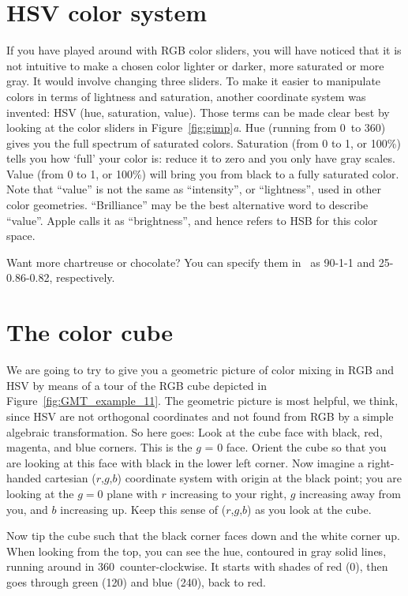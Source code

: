 \section{HSV color system}
If you have played around with RGB color sliders, you will have noticed that it is not intuitive to make a chosen color lighter or darker, more saturated or more gray. It would involve changing three sliders. To make it easier to manipulate colors in terms of lightness and saturation, another coordinate system was invented: HSV (hue, saturation, value). Those terms can be made clear best by looking at the color sliders in Figure~\ref{fig:gimp}\emph{a}. Hue (running from 0\DS\ to 360\DS) gives you the full spectrum of saturated colors. Saturation (from 0 to 1, or 100\%) tells you how `full' your color is: reduce it to zero and you only have gray scales. Value (from 0 to 1, or 100\%) will bring you from black to a fully saturated color. Note that ``value'' is not the same as ``intensity'', or ``lightness'', used in other color geometries. ``Brilliance'' may be the best alternative word to describe ``value''. Apple calls it as ``brightness'', and hence refers to HSB for this color space.

Want more chartreuse or chocolate? You can specify them in \GMT\ as 90-1-1 and 25-0.86-0.82, respectively.

\section{The color cube}
We are going to try to give you a geometric picture of color
mixing in RGB and HSV by means of a tour of the RGB cube depicted in Figure~\ref{fig:GMT_example_11}.  The geometric
picture is most helpful, we think, since HSV are not orthogonal
coordinates and not found from RGB by a simple algebraic transformation.
So here goes: Look at the
cube face with black, red, magenta, and blue corners.
This is the $g$ = 0 face.  Orient the cube so that you are
looking at this face with black in the lower left corner.  Now
imagine a right-handed cartesian ($r$,$g$,$b$) coordinate system
with origin at the black point; you are looking at the $g = 0$
plane with $r$ increasing to your right, $g$ increasing
away from you, and $b$ increasing up.  Keep this sense of
($r$,$g$,$b$) as you look at the cube.

Now tip the cube such that the black corner faces down and the white corner up. When looking from the top, you can see the hue, contoured in gray solid lines, running around in 360\DS\ counter-clockwise. It starts with shades of red (0\DS), then goes through green (120\DS) and blue (240\DS), back to red.

